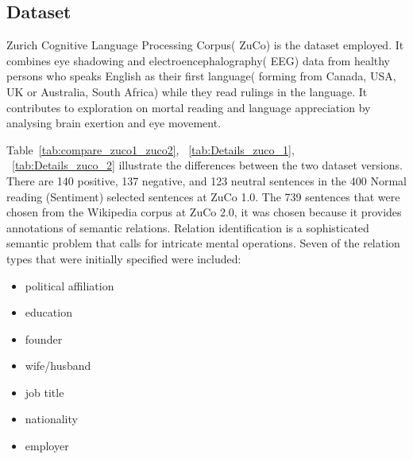 \documentclass[journal]{IEEEtran}
\begin{document}
\subsection{Dataset}

Zurich Cognitive Language Processing Corpus( ZuCo) is the dataset employed. It combines eye shadowing and electroencephalography( EEG) data from healthy persons who speaks English as their first language( forming from Canada, USA, UK or Australia, South Africa) while they read rulings in the language. It contributes to exploration on mortal reading and language appreciation by analysing brain exertion and eye movement. 


Table~\ref{tab:compare_zuco1_zuco2}, ~\ref{tab:Details_zuco_1}, ~\ref{tab:Details_zuco_2} illustrate the differences between the two dataset versions. There are 140 positive, 137 negative, and 123 neutral sentences in the 400 Normal reading (Sentiment) selected sentences at ZuCo 1.0. The 739 sentences that were chosen from the Wikipedia corpus at ZuCo 2.0, it was chosen because it provides annotations of semantic relations. Relation identification is a sophisticated semantic problem that calls for intricate mental operations. Seven of the relation types that were initially specified were included: 
\begin{itemize}
	\item political affiliation
	\item education
	\item founder
	\item wife/husband
	\item job title
	\item nationality
	\item employer
\end{itemize}
\end{document}
